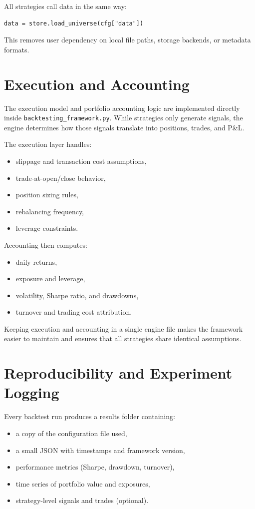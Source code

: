 \documentclass[11pt]{article}
\begin{document}
All strategies call data in the same way:

\begin{verbatim}
data = store.load_universe(cfg["data"])
\end{verbatim}

This removes user dependency on local file paths, storage backends, or metadata formats.

\section{Execution and Accounting}

The execution model and portfolio accounting logic are implemented directly inside
\texttt{backtesting\_framework.py}. While strategies only generate signals, the engine
determines how those signals translate into positions, trades, and P\&L.

The execution layer handles:
\begin{itemize}
    \item slippage and transaction cost assumptions,
    \item trade-at-open/close behavior,
    \item position sizing rules,
    \item rebalancing frequency,
    \item leverage constraints.
\end{itemize}

Accounting then computes:
\begin{itemize}
    \item daily returns,
    \item exposure and leverage,
    \item volatility, Sharpe ratio, and drawdowns,
    \item turnover and trading cost attribution.
\end{itemize}

Keeping execution and accounting in a single engine file makes the framework easier 
to maintain and ensures that all strategies share identical assumptions.

\section{Reproducibility and Experiment Logging}

Every backtest run produces a results folder containing:

\begin{itemize}
    \item a copy of the configuration file used,
    \item a small JSON with timestamps and framework version,
    \item performance metrics (Sharpe, drawdown, turnover),
    \item time series of portfolio value and exposures,
    \item strategy-level signals and trades (optional).
\end{itemize}
\end{document}
